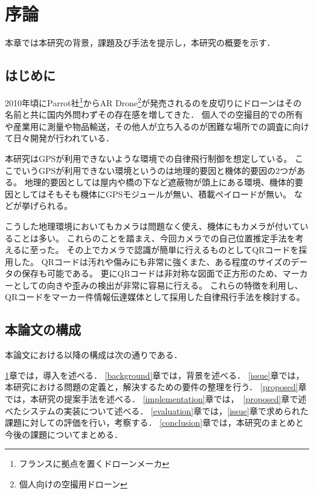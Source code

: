 \chapter{序論}
\label{introduction}

本章では本研究の背景，課題及び手法を提示し，本研究の概要を示す．

\section{はじめに}
\label{introduction:background}
2010年頃にParrot社\footnote{フランスに拠点を置くドローンメーカ}からAR Drone\footnote{個人向けの空撮用ドローン}が発売されるのを皮切りにドローンはその名前と共に国内外問わずその存在感を増してきた．
個人での空撮目的での所有や産業用に測量や物品輸送，その他人が立ち入るのが困難な場所での調査に向けて日々開発が行われている．

本研究はGPSが利用できないような環境での自律飛行制御を想定している。
ここでいうGPSが利用できない環境というのは地理的要因と機体的要因の2つがある。
地理的要因としては屋内や橋の下など遮蔽物が頭上にある環境、機体的要因としてはそもそも機体にGPSモジュールが無い、積載ペイロードが無い。
などが挙げられる。

こうした地理環境においてもカメラは問題なく使え、機体にもカメラが付いていることは多い。
これらのことを踏まえ、今回カメラでの自己位置推定手法を考えるに至った。
その上でカメラで認識が簡単に行えるものとしてQRコードを採用した。
QRコードは汚れや傷みにも非常に強くまた、ある程度のサイズのデータの保存も可能である。
更にQRコードは非対称な図面で正方形のため、マーカーとしての向きや歪みの検出が非常に容易に行える。
これらの特徴を利用し、QRコードをマーカー件情報伝達媒体として採用した自律飛行手法を検討する。


\section{本論文の構成}

本論文における以降の構成は次の通りである．

\ref{introduction}章では，導入を述べる．
\ref{background}章では，背景を述べる．
\ref{issue}章では，本研究における問題の定義と，解決するための要件の整理を行う．
\ref{proposed}章では，本研究の提案手法を述べる．
\ref{implementation}章では，~\ref{proposed}章で述べたシステムの実装について述べる．
\ref{evaluation}章では，\ref{issue}章で求められた課題に対しての評価を行い，考察する．
\ref{conclusion}章では，本研究のまとめと今後の課題についてまとめる．


